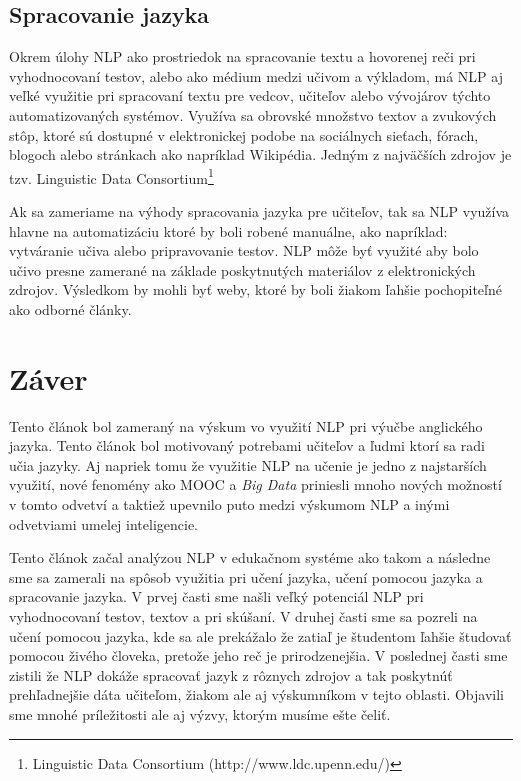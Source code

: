 \documentclass[10pt,slovak,a4paper,twoside]{article}
\begin{document}
\subsection{Spracovanie jazyka} \label{spracovanie_jazyka}
	Okrem úlohy NLP ako prostriedok na spracovanie textu a hovorenej reči pri vyhodnocovaní testov, 
	alebo ako médium medzi učivom a výkladom, má NLP aj veľké využitie pri spracovaní textu pre vedcov, 
	učiteľov alebo vývojárov týchto automatizovaných systémov. Využíva sa obrovské množstvo textov a zvukových
	stôp, ktoré sú dostupné v elektronickej podobe na sociálnych sieťach, fórach, blogoch alebo stránkach ako 
	napríklad Wikipédia. Jedným z najväčších zdrojov je tzv. Linguistic Data Consortium\footnote{Linguistic Data Consortium (http://www.ldc.upenn.edu/)}
	
	Ak sa zameriame na výhody spracovania jazyka pre učiteľov, tak sa NLP využíva hlavne na automatizáciu ktoré by boli robené manuálne, 
	ako napríklad: vytváranie učiva alebo pripravovanie testov. NLP môže byť využité aby bolo učivo presne zamerané na základe 
	poskytnutých materiálov z elektronických zdrojov. Výsledkom by mohli byť weby, ktoré by boli žiakom ľahšie pochopiteľné ako odborné články\cite{miltsakaki2009matching}.

\section{Záver} \label{zaver} %
	Tento článok bol zameraný na výskum vo využití NLP pri výučbe anglického jazyka. Tento článok bol motivovaný 
	potrebami učiteľov a ľudmi ktorí sa radi učia jazyky. Aj napriek tomu že využitie NLP na učenie je jedno z najstarších využití, 
	nové fenomény ako MOOC a \textit{Big Data} priniesli mnoho nových možností v tomto odvetví a taktiež upevnilo puto medzi výskumom NLP a inými 
	odvetviami umelej inteligencie.

	Tento článok začal analýzou NLP v edukačnom systéme ako takom a následne sme sa zamerali na spôsob využitia pri učení jazyka, 
	učení pomocou jazyka a spracovanie jazyka. V prvej časti sme našli veľký potenciál NLP pri vyhodnocovaní testov, textov a pri skúšaní.
	V druhej časti sme sa pozreli na učení pomocou jazyka, kde sa ale prekážalo že zatiaľ je študentom ľahšie študovať pomocou živého človeka, 
	pretože jeho reč je prirodzenejšia. V poslednej časti sme zistili že NLP dokáže spracovať jazyk z rôznych zdrojov a tak poskytnúť prehľadnejšie dáta
	učiteľom, žiakom ale aj výskumníkom v tejto oblasti. Objavili sme mnohé príležitosti ale aj výzvy, ktorým musíme ešte čeliť.



 
\end{document}
